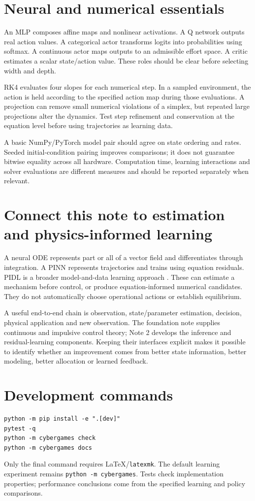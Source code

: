 \documentclass[11pt,a4paper]{article}
\theoremstyle{definition}
\theoremstyle{remark}
\begin{document}
\appendix
\section{Neural and numerical essentials}
An MLP composes affine maps and nonlinear activations. A Q network outputs real action values. A categorical actor transforms logits into probabilities using softmax. A continuous actor maps outputs to an admissible effort space. A critic estimates a scalar state/action value. These roles should be clear before selecting width and depth.

RK4 evaluates four slopes for each numerical step. In a sampled environment, the action is held according to the specified action map during those evaluations. A projection can remove small numerical violations of a simplex, but repeated large projections alter the dynamics. Test step refinement and conservation at the equation level before using trajectories as learning data.

A basic NumPy/PyTorch model pair should agree on state ordering and rates. Seeded initial-condition pairing improves comparisons; it does not guarantee bitwise equality across all hardware. Computation time, learning interactions and solver evaluations are different measures and should be reported separately when relevant.

\section{Connect this note to estimation and physics-informed learning}
A neural ODE represents part or all of a vector field and differentiates through integration. A PINN represents trajectories and trains using equation residuals. PIDL is a broader model-and-data learning approach \cite{neuralode,pinn}. These can estimate a mechanism before control, or produce equation-informed numerical candidates. They do not automatically choose operational actions or establish equilibrium.

A useful end-to-end chain is observation, state/parameter estimation, decision, physical application and new observation. The foundation note supplies continuous and impulsive control theory; Note 2 develops the inference and residual-learning components. Keeping their interfaces explicit makes it possible to identify whether an improvement comes from better state information, better modeling, better allocation or learned feedback.

\section{Development commands}
\begin{lstlisting}[language={}]
python -m pip install -e ".[dev]"
pytest -q
python -m cybergames check
python -m cybergames docs
\end{lstlisting}
Only the final command requires LaTeX/\texttt{latexmk}. The default learning experiment remains \texttt{python -m cybergames}. Tests check implementation properties; performance conclusions come from the specified learning and policy comparisons.
\end{document}

